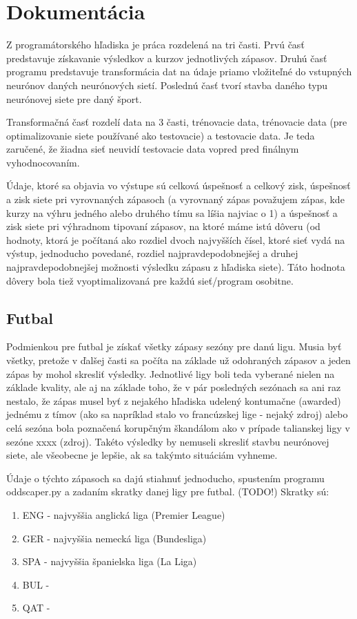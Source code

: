\chapter{Dokumentácia}

Z programátorského hľadiska je práca rozdelená na tri časti. 
Prvú časť predstavuje získavanie výsledkov a kurzov jednotlivých zápasov. 
Druhú časť programu predstavuje transformácia dat na údaje priamo vložiteľné do vstupných neurónov daných neurónových sietí.
Poslednú časť tvorí stavba daného typu neurónovej siete pre daný šport.

Transformačná časť rozdelí data na 3 časti, trénovacie data, trénovacie data (pre optimalizovanie siete používané ako testovacie) a testovacie data.
Je teda zaručené, že žiadna sieť neuvidí testovacie data vopred pred finálnym vyhodnocovaním.

Údaje, ktoré sa objavia vo výstupe sú celková úspešnosť a celkový zisk, úspešnosť a zisk siete pri vyrovnaných zápasoch (a vyrovnaný zápas považujem zápas, kde kurzy na výhru jedného alebo druhého tímu sa líšia najviac o 1) a úspešnosť a zisk siete pri výhradnom tipovaní zápasov, na ktoré máme istú dôveru (od hodnoty, ktorá je počítaná ako rozdiel dvoch najvyšších čísel, ktoré sieť vydá na výstup, jednoducho povedané, rozdiel najpravdepodobnejšej a druhej najpravdepodobnejšej možnosti výsledku zápasu z hľadiska siete).
Táto hodnota dôvery bola tiež vyoptimalizovaná pre každú sieť/program osobitne.

\section{Futbal}

Podmienkou pre futbal je získať všetky zápasy sezóny pre danú ligu. 
Musia byť všetky, pretože v ďalšej časti sa počíta na základe už odohraných zápasov a jeden zápas by mohol skresliť výsledky. 
Jednotlivé ligy boli teda vyberané nielen na základe kvality, ale aj na základe toho, že v pár posledných sezónach sa ani raz nestalo, že zápas musel byť z nejakého hľadiska udelený kontumačne (awarded) jednému z tímov (ako sa napríklad stalo vo francúzskej lige - nejaký zdroj) alebo celá sezóna bola poznačená korupčným škandálom ako v prípade talianskej ligy v sezóne xxxx (zdroj).
Takéto výsledky by nemuseli skresliť stavbu neurónovej siete, ale všeobecne je lepšie, ak sa takýmto situáciám vyhneme.

Údaje o týchto zápasoch sa dajú stiahnuť jednoducho, spustením programu oddscaper.py a zadaním skratky danej ligy pre futbal. (TODO!)
Skratky sú:
\begin{enumerate}
\item ENG - najvyššia anglická liga (Premier League)
\item GER - najvyššia nemecká liga (Bundesliga)
\item SPA - najvyššia španielska liga (La Liga)
\item BUL -
\item QAT -
\end{enumerate}

